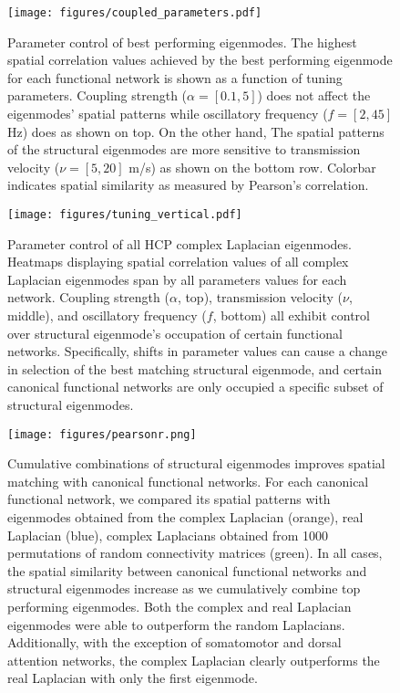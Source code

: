 \documentclass{article}
\begin{document}
\begin{figure}[ht]
\centering
\texttt{[image: figures/coupled\_parameters.pdf]}
\caption{Parameter control of best performing eigenmodes. The highest spatial correlation values achieved by the best performing eigenmode for each functional network is shown as a function of tuning parameters. Coupling strength ($\alpha = [0.1, 5]$) does not affect the eigenmodes' spatial patterns while oscillatory frequency ($f = [2, 45]$ Hz) does as shown on top. On the other hand, The spatial patterns of the structural eigenmodes are more sensitive to transmission velocity ($\nu = [5, 20]$ m/s) as shown on the bottom row. Colorbar indicates spatial similarity as measured by Pearson's correlation.}
\label{fig:fig4}
\end{figure}

\begin{figure}[ht]
\centering
\texttt{[image: figures/tuning\_vertical.pdf]}
\caption{Parameter control of all HCP complex Laplacian eigenmodes. Heatmaps displaying spatial correlation values of all complex Laplacian eigenmodes span by all parameters values for each network. Coupling strength ($\alpha$, top), transmission velocity ($\nu$, middle), and oscillatory frequency ($f$, bottom) all exhibit control over structural eigenmode's occupation of certain functional networks. Specifically, shifts in parameter values can cause a change in selection of the best matching structural eigenmode, and certain canonical functional networks are only occupied a specific subset of structural eigenmodes.}
\label{fig:fig5}
\end{figure}

\begin{figure}[ht]
\centering
\texttt{[image: figures/pearsonr.png]}
\caption{Cumulative combinations of structural eigenmodes improves spatial matching with canonical functional networks. For each canonical functional network, we compared its spatial patterns with eigenmodes obtained from the complex Laplacian (orange), real Laplacian (blue), complex Laplacians obtained from 1000 permutations of random connectivity matrices (green). In all cases, the spatial similarity between canonical functional networks and structural eigenmodes increase as we cumulatively combine top performing eigenmodes. Both the complex and real Laplacian eigenmodes were able to outperform the random Laplacians. Additionally, with the exception of somatomotor and dorsal attention networks, the complex Laplacian clearly outperforms the real Laplacian with only the first eigenmode.}
\label{fig:fig6}
\end{figure}
\end{document}
